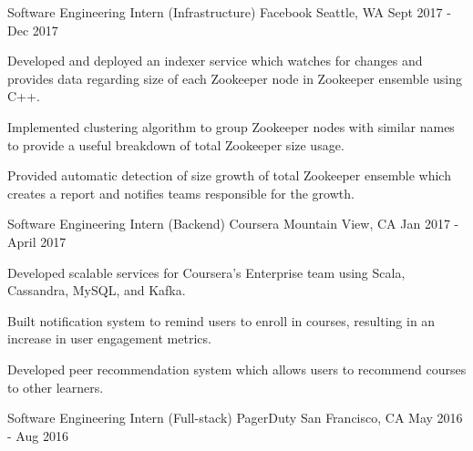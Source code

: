 

\begin{cventries}
  \cventry
  {Software Engineering Intern (Infrastructure)} %
    {Facebook} %
    {Seattle, WA} %
    {Sept 2017 - Dec 2017} %
    {
      \begin{cvitems} %
      \item {Developed and deployed an indexer service which watches for changes and provides data regarding size of each Zookeeper node in Zookeeper ensemble using C++.}
      \item {Implemented clustering algorithm to group Zookeeper nodes with similar names to provide a useful breakdown of total Zookeeper size usage.}
      \item {Provided automatic detection of size growth of total Zookeeper ensemble which creates a report and notifies teams responsible for the growth.}
      \end{cvitems}
    }
  \cventry
  {Software Engineering Intern (Backend)} %
    {Coursera} %
    {Mountain View, CA} %
    {Jan 2017 - April 2017} %
    {
      \begin{cvitems} %
      \item {Developed scalable services for Coursera's Enterprise team using Scala, Cassandra, MySQL, and Kafka.}
      \item {Built notification system to remind users to enroll in courses, resulting in an increase in user engagement metrics.}
      \item {Developed peer recommendation system which allows users to recommend courses to other learners.}
      \end{cvitems}
    }
  \cventry
  {Software Engineering Intern (Full-stack)} %
    {PagerDuty} %
    {San Francisco, CA} %
    {May 2016 - Aug 2016} %
    {
      \begin{cvitems} %

\end{cvitems}}
\end{cventries}
